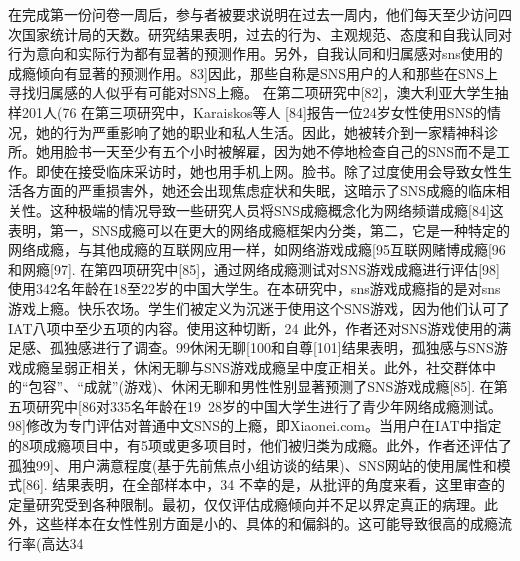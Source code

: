 在完成第一份问卷一周后，参与者被要求说明在过去一周内，他们每天至少访问四次国家统计局的天数。研究结果表明，过去的行为、主观规范、态度和自我认同对行为意向和实际行为都有显著的预测作用。另外，自我认同和归属感对sns使用的成瘾倾向有显著的预测作用。83]因此，那些自称是SNS用户的人和那些在SNS上寻找归属感的人似乎有可能对SNS上瘾。
在第二项研究中[82]，澳大利亚大学生抽样201人(76%
在第三项研究中，Karaiskos等人 [84]报告一位24岁女性使用SNS的情况，她的行为严重影响了她的职业和私人生活。因此，她被转介到一家精神科诊所。她用脸书一天至少有五个小时被解雇，因为她不停地检查自己的SNS而不是工作。即使在接受临床采访时，她也用手机上网。脸书。除了过度使用会导致女性生活各方面的严重损害外，她还会出现焦虑症状和失眠，这暗示了SNS成瘾的临床相关性。这种极端的情况导致一些研究人员将SNS成瘾概念化为网络频谱成瘾[84]这表明，第一，SNS成瘾可以在更大的网络成瘾框架内分类，第二，它是一种特定的网络成瘾，与其他成瘾的互联网应用一样，如网络游戏成瘾[95互联网赌博成瘾[96和网瘾[97].
在第四项研究中[85]，通过网络成瘾测试对SNS游戏成瘾进行评估[98]使用342名年龄在18至22岁的中国大学生。在本研究中，sns游戏成瘾指的是对sns游戏上瘾。快乐农场。学生们被定义为沉迷于使用这个SNS游戏，因为他们认可了IAT八项中至少五项的内容。使用这种切断，24%
此外，作者还对SNS游戏使用的满足感、孤独感进行了调查。99休闲无聊[100和自尊[101]结果表明，孤独感与SNS游戏成瘾呈弱正相关，休闲无聊与SNS游戏成瘾呈中度正相关。此外，社交群体中的“包容”、“成就”(游戏)、休闲无聊和男性性别显著预测了SNS游戏成瘾[85].
在第五项研究中[86对335名年龄在19~28岁的中国大学生进行了青少年网络成瘾测试。98]修改为专门评估对普通中文SNS的上瘾，即Xiaonei.com。当用户在IAT中指定的8项成瘾项目中，有5项或更多项目时，他们被归类为成瘾。此外，作者还评估了孤独99]、用户满意程度(基于先前焦点小组访谈的结果)、SNS网站的使用属性和模式[86].
结果表明，在全部样本中，34%
不幸的是，从批评的角度来看，这里审查的定量研究受到各种限制。最初，仅仅评估成瘾倾向并不足以界定真正的病理。此外，这些样本在女性性别方面是小的、具体的和偏斜的。这可能导致很高的成瘾流行率(高达34%
